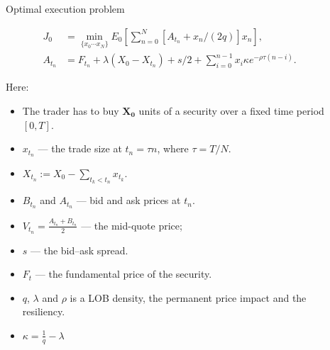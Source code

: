 \documentclass[]{beamer}
\begin{document}
\begin{frame}[t]
\begin{columns}[t]
\begin{column}{\onecolwid}
\begin{block}{Optimal execution problem}
        
        \begin{align*} \label{oEproblem}
           J_0 &= \min _{\{x_0 \cdots x_N \}} E_0 \left[ \sum _{n=0}^N [A_{t_n} + x_n /(2q)] x_n\right],  \\
           A_{t_n} &= F_{t_n} + \lambda (X_0 - X_{t_n}) + s/2 + \sum _{i=0}^{n-1} x_i \kappa e^{- \rho \tau (n - i)}.
        \end{align*}
        
       Here:
       \begin{itemize}
        \item The trader has to buy $\mathbf{X_0}$ units of a security over a ﬁxed time period $[0,T]$. 
        \item $x_{t_n}$ 
        --- the trade size at $t_n = \tau n$, where $\tau = T / N$. 
        \item $X_{t_n} := X_0 - \sum _{t_k < t_n} x_{t_k}$. 
        \item $B_{t_n}$ and $A_{t_n}$ --- bid and ask prices at $t_n$. 
        \item $V_{t_n} = \frac{A_{t_n} + B_{t_n}}{2}$ 
        --- the mid-quote price; 
        \item $s$ --- the bid–ask spread.
        \item $F_t$ --- the fundamental price of the security.
        \item $q$, $\lambda$ and $\rho$ is a LOB density, the permanent price impact and the resiliency.
         \item $\kappa = \frac{1}{q} - \lambda $

       \end{itemize}
        \end{block}

    
    
    \end{column} 
    \begin{column}{\sepwid}\end{column} %
    
    \begin{column}{\onecolwid} %


\end{column}
\end{columns}
\end{frame}
\end{document}
